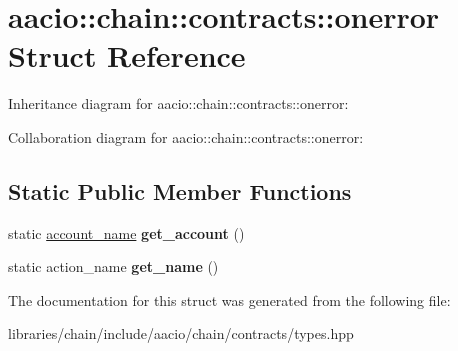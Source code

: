 \hypertarget{structaacio_1_1chain_1_1contracts_1_1onerror}{}\section{aacio\+:\+:chain\+:\+:contracts\+:\+:onerror Struct Reference}
\label{structaacio_1_1chain_1_1contracts_1_1onerror}


Inheritance diagram for aacio\+:\+:chain\+:\+:contracts\+:\+:onerror\+:


Collaboration diagram for aacio\+:\+:chain\+:\+:contracts\+:\+:onerror\+:
\subsection*{Static Public Member Functions}
\begin{DoxyCompactItemize}
\item 
\mbox{\label{structaacio_1_1chain_1_1contracts_1_1onerror_a6b69bcaafae4c42465797589ed113853}} 
static \mbox{\hyperlink{structaacio_1_1chain_1_1name}{account\+\_\+name}} {\bfseries get\+\_\+account} ()
\item 
\mbox{\label{structaacio_1_1chain_1_1contracts_1_1onerror_a2cff7712a1d2f10371e0ffadd743c4bf}} 
static action\+\_\+name {\bfseries get\+\_\+name} ()
\end{DoxyCompactItemize}


The documentation for this struct was generated from the following file\+:\begin{DoxyCompactItemize}
\item 
libraries/chain/include/aacio/chain/contracts/types.\+hpp\end{DoxyCompactItemize}
